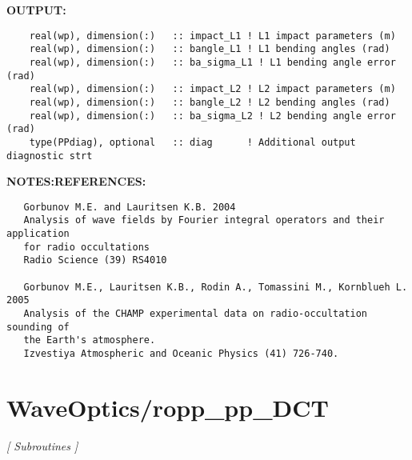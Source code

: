 \textbf{OUTPUT:}\hspace{0.08in}\begin{Verbatim}
    real(wp), dimension(:)   :: impact_L1 ! L1 impact parameters (m)
    real(wp), dimension(:)   :: bangle_L1 ! L1 bending angles (rad)
    real(wp), dimension(:)   :: ba_sigma_L1 ! L1 bending angle error (rad)
    real(wp), dimension(:)   :: impact_L2 ! L2 impact parameters (m)
    real(wp), dimension(:)   :: bangle_L2 ! L2 bending angles (rad)
    real(wp), dimension(:)   :: ba_sigma_L2 ! L2 bending angle error (rad)
    type(PPdiag), optional   :: diag      ! Additional output diagnostic strt
\end{Verbatim}
\textbf{NOTES:}\hspace{0.08in}\textbf{REFERENCES:}\hspace{0.08in}\begin{Verbatim}
   Gorbunov M.E. and Lauritsen K.B. 2004
   Analysis of wave fields by Fourier integral operators and their application
   for radio occultations
   Radio Science (39) RS4010

   Gorbunov M.E., Lauritsen K.B., Rodin A., Tomassini M., Kornblueh L. 2005 
   Analysis of the CHAMP experimental data on radio-occultation sounding of
   the Earth's atmosphere.
   Izvestiya Atmospheric and Oceanic Physics (41) 726-740.
\end{Verbatim}
\section{WaveOptics/ropp\_pp\_DCT}
\textsl{[ Subroutines ]}

